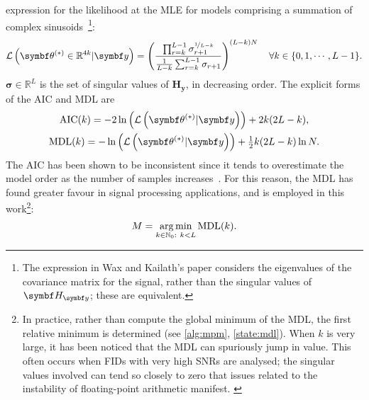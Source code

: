 expression for the likelihood at the \ac{MLE} for models comprising a summation
of complex sinusoids~\cite{Wax1985}\footnote{
    The expression in Wax and Kailath's paper considers the eigenvalues of the
    covariance matrix for the signal, rather than the singular values of $\Hy$;
    these are equivalent.
}:
\begin{equation}
    \mathcal{L}\left(\bthstar \in \mathbb{R}^{4k} | \by\right) = \left(
        \frac{
            \prod_{r=k}^{L-1} \sigma_{r+1}^{\nicefrac{1}{L-k}}
        }{
            \frac{1}{L-k} \sum_{r=k}^{L-1} \sigma_{r+1}
        }
        \right)^{(L - k) N}
        \quad \forall k \in \lbrace 0, 1, \cdots, L - 1 \rbrace.
        \label{eq:wax-pdf}
\end{equation}
$\symbf{\sigma} \in
\mathbb{R}^L$ is the set of singular values of $\symbf{H}_{\symbf{y}}$,
in decreasing order. The explicit forms of the \ac{AIC} and \ac{MDL} are
\begin{subequations}
    \begin{gather}
        \operatorname{AIC}(k) = -2 \ln\left( \mathcal{L} \left(\bthstar | \by\right) \right) + 2k(2 L - k), \\
        \operatorname{MDL}(k) = -\ln\left( \mathcal{L} \left(\bthstar | \by\right) \right) + \tfrac{1}{2} k(2 L - k) \ln N. \label{eq:mdl}
    \end{gather}
\end{subequations}
The \ac{AIC} has been shown to be inconsistent since it tends to overestimate
the model order as the number of samples increases~\cite{Wax1985}. For this
reason, the \ac{MDL} has found greater favour in signal processing
applications, and is employed in this work\footnote{
    In practice, rather than compute the global minimum of the \ac{MDL}, the
    first relative minimum is determined (see \cref{alg:mpm},
    \cref{state:mdl}). When $k$ is very large, it has been noticed that the
    \ac{MDL} can spuriously jump in value. This often occurs when \acp{FID}
    with very high \acp{SNR} are analysed; the singular values involved
    can tend so closely to zero that issues related to the instability of
    floating-point arithmetic manifest.
    \label{fn:argrelmin}
}:
\begin{equation}%
    M = \argmin_{k \in \mathbb{N}_0 :\ k < L} \operatorname{MDL} (k).%
\end{equation}%
